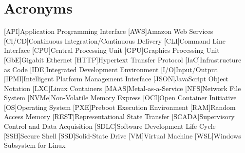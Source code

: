 {}
\chapter*{Acronyms}

\begin{acronym}
\setlength{\itemsep}{-14pt}
[API]{Application Programming Interface}
[AWS]{Amazon Web Services}
[CI/CD]{Continuous Integration/Continuous Delivery}
[CLI]{Command Line Interface}
[CPU]{Central Processing Unit}
[GPU]{Graphics Processing Unit}
[GbE]{Gigabit Ethernet}
[HTTP]{Hypertext Transfer Protocol}
[IaC]{Infrastructure as Code}
[IDE]{Integrated Development Environment}
[I/O]{Input/Output}
[IPMI]{Intelligent Platform Management Interface}
[JSON]{JavaScript Object Notation}
[LXC]{Linux Containers}
[MAAS]{Metal-as-a-Service}
[NFS]{Network File System}
[NVMe]{Non-Volatile Memory Express}
[OCI]{Open Container Initiative}
[OS]{Operating System}
[PXE]{Preboot Execution Environment}
[RAM]{Random Access Memory}
[REST]{Representational State Transfer}
[SCADA]{Supervisory Control and Data Acquisition}
[SDLC]{Software Development Life Cycle}
[SSH]{Secure Shell}
[SSD]{Solid-State Drive}
[VM]{Virtual Machine}
[WSL]{Windows Subsystem for Linux}
\end{acronym}
